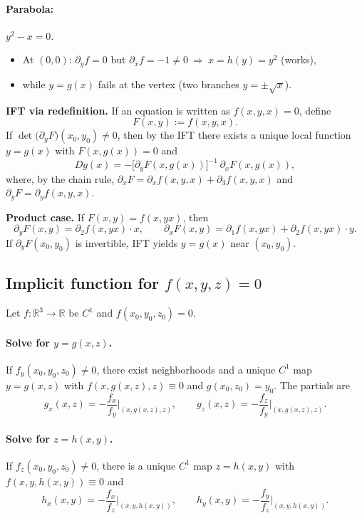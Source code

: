 \documentclass[12pt,a4paper]{article}
\theoremstyle{plain}
\theoremstyle{definition}
\theoremstyle{remark}
\theoremstyle{remark}
\begin{document}
	\paragraph{Parabola:} $y^2 - x = 0.$
	\begin{itemize}
		\item At $(0,0)$: $\partial_y f = 0$ but $\partial_x f = -1 \neq 0 \ \Rightarrow\ 
		x = h(y) = y^2$ (works),
		\item while $y = g(x)$ fails at the vertex (two branches $y=\pm\sqrt{x}$).
	\end{itemize}
	
	\textbf{IFT via redefinition.} If an equation is written as $f(x,y,x)=0$, define
	\[
	F(x,y):=f(x,y,x).
	\]
	If $\det\big(\partial_y F\big)(x_0,y_0)\neq0$, then by the IFT there exists a unique
	local function $y=g(x)$ with $F(x,g(x))=0$ and
	\[
	Dg(x)=-\big[\partial_y F(x,g(x))\big]^{-1}\,\partial_x F(x,g(x)),
	\]
	where, by the chain rule,
	$\partial_x F=\partial_x f(x,y,x)+\partial_{3} f(x,y,x)$ and
	$\partial_y F=\partial_y f(x,y,x)$.
	
	\medskip
	\textbf{Product case.} If $F(x,y)=f(x, yx)$, then
	\[
	\partial_y F(x,y)=\partial_2 f(x,yx)\cdot x,\qquad
	\partial_x F(x,y)=\partial_1 f(x,yx)+\partial_2 f(x,yx)\cdot y.
	\]
	If $\partial_y F(x_0,y_0)$ is invertible, IFT yields $y=g(x)$ near $(x_0,y_0)$.
	
	
	\subsection*{Implicit function for $f(x,y,z)=0$}
	
	Let $f:\mathbb R^3\to\mathbb R$ be $C^1$ and $f(x_0,y_0,z_0)=0$.
	
	\paragraph{Solve for $y=g(x,z)$.}
	If $f_y(x_0,y_0,z_0)\neq 0$, there exist neighborhoods and a unique $C^1$ map
	$y=g(x,z)$ with $f(x,g(x,z),z)\equiv 0$ and $g(x_0,z_0)=y_0$. The partials are
	\[
	g_x(x,z)= -\frac{f_x}{f_y}\Big|_{(x,g(x,z),z)},\qquad
	g_z(x,z)= -\frac{f_z}{f_y}\Big|_{(x,g(x,z),z)}.
	\]
	
	\paragraph{Solve for $z=h(x,y)$.}
	If $f_z(x_0,y_0,z_0)\neq 0$, there is a unique $C^1$ map $z=h(x,y)$ with
	$f(x,y,h(x,y))\equiv 0$ and
	\[
	h_x(x,y)= -\frac{f_x}{f_z}\Big|_{(x,y,h(x,y))},\qquad
	h_y(x,y)= -\frac{f_y}{f_z}\Big|_{(x,y,h(x,y))}.
	\]
	
\end{document}
